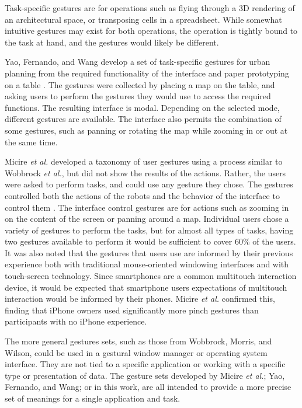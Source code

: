 Task-specific gestures are for operations such as flying through a 3D rendering of an architectural space, or transposing cells in a spreadsheet. 
While somewhat intuitive gestures may exist for both operations, the operation is tightly bound to the task at hand, and the gestures would likely be different. 

Yao, Fernando, and Wang develop a set of task-specific gestures for urban planning from the required functionality of the interface and paper prototyping on a table \citep{yao2012multi}. 
The gestures were collected by placing a map on the table, and asking users to perform the gestures they would use to access the required functions. 
The resulting interface is modal.
Depending on the selected mode, different gestures are available. 
The interface also permits the combination of some gestures, such as panning or rotating the map while zooming in or out at the same time. 

Micire \textit{et al.} developed a taxonomy of user gestures using a process similar to Wobbrock \emph{et al.}, but did not show the results of the actions. 
Rather, the users were asked to perform tasks, and could use any gesture they chose. 
The gestures controlled both the actions of the robots and the behavior of the interface to control them \citep{Micire:2009:ANG:1731903.1731912}. 
The interface control gestures are for actions such as zooming in on the content of the screen or panning around a map. 
Individual users chose a variety of gestures to perform the tasks, but for almost all types of tasks, having two gestures available to perform it would be sufficient to cover 60\% of the users. 
It was also noted that the gestures that users use are informed by their previous experience both with traditional mouse-oriented windowing interfaces and with touch-screen technology. 
Since smartphones are a common multitouch interaction device, it would be expected that smartphone users expectations of multitouch interaction would be informed by their phones. 
Micire \textit{et al.} confirmed this, finding that iPhone owners used significantly more pinch gestures than participants with no iPhone experience. 

The more general gestures sets, such as those from Wobbrock, Morris, and Wilson, could be used in a gestural window manager or operating system interface. 
They are not tied to a specific application or working with a specific type or presentation of data.
The gesture sets developed by Micire \textit{et al.}; Yao, Fernando, and Wang; or in this work, are all intended to provide a more precise set of meanings for a single application and task. 


